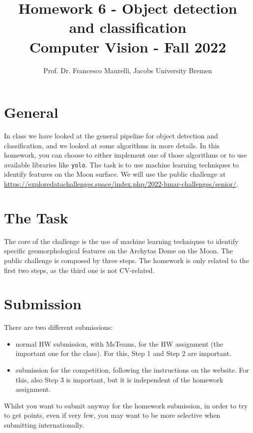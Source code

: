 \documentclass[a4paper,twoside,10pt]{article}
\begin{document}
\title{Homework 6 - Object detection and classification \\ Computer Vision - Fall 2022}
\author{Prof. Dr. Francesco Maurelli, Jacobs University Bremen}
\date{}

\maketitle

\section{General}
In class we have looked at the general pipeline for object detection and classification, and we looked at some algorithms in more details. In this homework, you can choose to either implement one of those algorithms or to use available libraries like \texttt{yolo}. The task is to use machine learning techniques to identify features on the Moon surface. We will use the public challenge at \url{https://exploredatachallenges.space/index.php/2022-lunar-challenges/senior/}.

\section{The Task}
The core of the challenge is the use of machine learning techniques to identify specific geomorphological features on the Archytas Dome on the Moon. The public challenge is composed by three steps. The homework is only related to the first two steps, as the third one is not CV-related.

\section{Submission}
There are two different submissions:
\begin{itemize}
\item normal HW submission, with MsTeams, for the HW assignment (the important one for the class). For this, Step 1 and Step 2 are important.
\item submission for the competition, following the instructions on the website. For this, also Step 3 is important, but it is independent of the homework assignment.
\end{itemize}
Whilst you want to submit anyway for the homework submission, in order to try to get points, even if very few, you may want to be more selective when submitting internationally.
\end{document}
